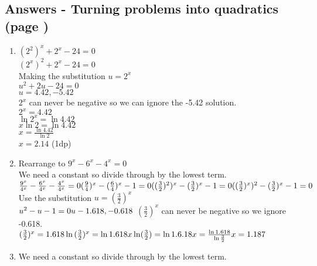 \documentclass[../main.tex]{subfiles}
\begin{document}
\subsection*{Answers - Turning problems into quadratics (page \pageref{quadratics})}

\begin{spacing}{1.5}
\begin{enumerate}
    \item
    \((2^2)^x+2^x-24=0\)\\
    \((2^x)^2+2^x-24=0\)\\
    Making the substitution \(u=2^x\)\\
    \(u^2+2u-24=0\)\\
    \(u=4.42, -5.42\)\\
    \(2^x\) can never be negative so we can ignore the -5.42 solution.\\
    \(2^x=4.42\)\\
    \(\ln{2^x}=\ln{4.42}\)\\
    \(x\ln{2}=\ln{4.42}\)\\
    \(x=\frac{\ln{4.42}}{\ln{2}}\)\\
    \(x=2.14\) (1dp)
    \item 
    Rearrange to \(9^x-6^x-4^x=0\)\\
    We need a constant so divide through by the lowest term.\\
    \(
    \frac{9^x}{4^x}-\frac{6^x}{4^x}-\frac{4^x}{4^x}=0\\
    (\frac{9}{4})^x-(\frac{6}{4})^x-1=0\\
    ((\frac{3}{2})^2)^x-(\frac{3}{2})^x-1=0\\
    ((\frac{3}{2})^x)^2-(\frac{3}{2})^x-1=0\\ 
    \)
    Use the substitution \(u=(\frac{3}{2})^x\)\\
    \(
    u^2-u-1=0\\
    u-1.618, -0.618\\
    \)
    \((\frac{3}{2})^x\) can never be negative so we ignore -0.618.\\
    \(
    (\frac{3}{2})^x=1.618\\
    \ln{(\frac{3}{2})^x}=\ln{1.618}\\
    x\ln(\frac{3}{2})=\ln{1.6.18}\\
    x=\frac{\ln{1.618}}{\ln{\frac{3}{2}}}\\
    x=1.187
    \)
    \item 
    We need a constant so divide through by the lowest term.\\

\end{enumerate}
\end{spacing}
\end{document}
